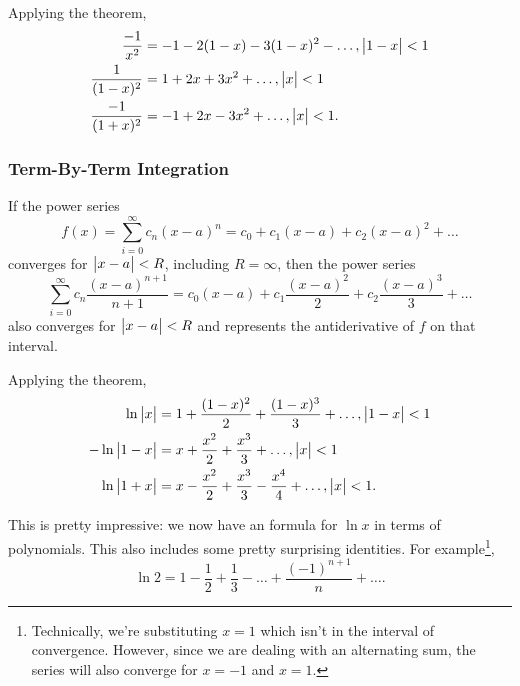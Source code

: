Applying the theorem,
\begin{align*}
	\frac{-1}{x^2} &= -1 - 2(1-x) - 3(1-x)^2 - \ldots, \big\lvert 1-x \big\rvert < 1 \\
	\frac{1}{(1-x)^2} &= 1 + 2x + 3x^2 + \ldots, \big\lvert x \big\rvert < 1 \\
	\frac{-1}{(1+x)^2} &= -1 + 2x - 3x^2 + \ldots, \big\lvert x \big\rvert < 1.
\end{align*}

\subsubsection{Term-By-Term Integration}
\begin{theorem}
	If the power series
	\begin{equation*}
		f(x) = \sum_{i=0}^{\infty}{c_n(x-a)^n} = c_0 + c_1(x-a) + c_2(x-a)^2 + \ldots
	\end{equation*}
	converges for $\big\lvert x-a \big\rvert < R$, including $R=\infty$, then the power series
	\begin{equation*}
		\sum_{i=0}^{\infty}{c_n\frac{(x-a)^{n+1}}{n+1}} = c_0(x-a) + c_1\frac{(x-a)^2}{2} + c_2\frac{(x-a)^3}{3} + \ldots
	\end{equation*}
	also converges for $\big\lvert x-a \big\rvert < R$ and represents the antiderivative of $f$ on that interval.
\end{theorem}

Applying the theorem,
\begin{align*}
	\ln{\big\lvert x \big\rvert} &= 1 + \frac{(1-x)^2}{2} + \frac{(1-x)^3}{3} + \ldots, \big\lvert 1-x \big\rvert < 1 \\
	-\ln{\big\lvert 1-x \big\rvert} &= x + \frac{x^2}{2} + \frac{x^3}{3} + \ldots, \big\lvert x \big\rvert < 1 \\
	\ln{\big\lvert 1+x \big\rvert} &= x - \frac{x^2}{2} + \frac{x^3}{3} - \frac{x^4}{4} + \ldots, \big\lvert x \big\rvert < 1.
\end{align*}

This is pretty impressive: we now have an formula for $\ln{x}$ in terms of polynomials.
This also includes some pretty surprising identities.
For example\footnote{Technically, we're substituting $x=1$ which isn't in the interval of convergence. However, since we are dealing with an alternating sum, the series will also converge for $x=-1$ and $x=1$.},
\begin{equation*}
	\ln{2} = 1 - \frac{1}{2} + \frac{1}{3} - \ldots + \frac{(-1)^{n+1}}{n} + \ldots.
\end{equation*}


